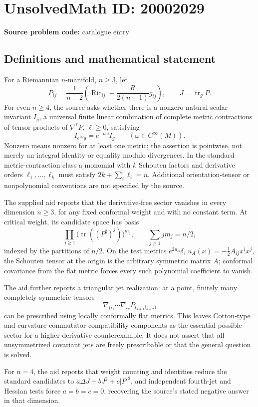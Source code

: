 \documentclass[11pt]{article}
\begin{document}
\section*{UnsolvedMath ID: 20002029}
\textbf{Source problem code:} catalogue entry
\subsection{Definitions and mathematical statement}
For a Riemannian \(n\)-manifold, \(n\geq3\), let
\[
P_{ij}=\frac1{n-2}\left(\operatorname{Ric}_{ij}-\frac R{2(n-1)}g_{ij}\right),\qquad
J=\operatorname{tr}_gP.
\]
For even \(n\geq4\), the source asks whether there is a nonzero natural scalar invariant \(I_g\), a universal finite linear combination of complete metric contractions of tensor products of \(\nabla^\ell P\), \(\ell\geq0\), satisfying
\[
I_{e^{2\omega}g}=e^{-n\omega}I_g\qquad(\omega\in C^\infty(M)).
\]
Nonzero means nonzero for at least one metric; the assertion is pointwise, not merely an integral identity or equality modulo divergences. In the standard metric-contraction class a monomial with \(k\) Schouten factors and derivative orders \(\ell_1,\ldots,\ell_k\) must satisfy \(2k+\sum_i\ell_i=n\). Additional orientation-tensor or nonpolynomial conventions are not specified by the source.

The supplied aid reports that the derivative-free sector vanishes in every dimension \(n\geq3\), for any fixed conformal weight and with no constant term. At critical weight, its candidate space has basis
\[
\prod_{j\geq1}\bigl(\operatorname{tr}((P^\sharp)^j)\bigr)^{m_j},
\qquad \sum_{j\geq1}j m_j=n/2,
\]
indexed by the partitions of \(n/2\). On the test metrics \(e^{2u_A}\delta\), \(u_A(x)=-\tfrac12A_{ij}x^ix^j\), the Schouten tensor at the origin is the arbitrary symmetric matrix \(A\); conformal covariance from the flat metric forces every such polynomial coefficient to vanish.

The aid further reports a triangular jet realization: at a point, finitely many completely symmetric tensors
\[
\nabla_{(i_1}\cdots\nabla_{i_k}P_{i_{k+1}i_{k+2})}
\]
can be prescribed using locally conformally flat metrics. This leaves Cotton-type and curvature-commutator compatibility components as the essential possible sector for a higher-derivative counterexample. It does not assert that all unsymmetrized covariant jets are freely prescribable or that the general question is solved.

For \(n=4\), the aid reports that weight counting and identities reduce the standard candidates to \(a\Delta J+bJ^2+c|P|^2\), and independent fourth-jet and Hessian tests force \(a=b=c=0\), recovering the source's stated negative answer in that dimension.
\end{document}
